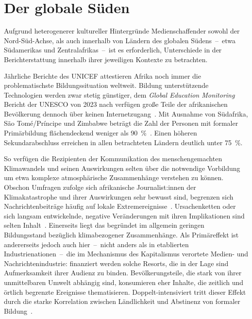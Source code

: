 \section{Der globale Süden}

Aufgrund heterogenerer kultureller Hintergründe Medienschaffender sowohl der Nord-Süd-Achse, als auch innerhalb von Ländern des globalen Südens~--~etwa Südamerikas und Zentralafrikas~--~ist es erforderlich, Unterschiede in der Berichterstattung innerhalb ihrer jeweiligen Kontexte zu betrachten.

Jährliche Berichte des UNICEF attestieren Afrika noch immer die problematischste Bildungssituation weltweit.
Bildung unterstützende Technologien werden zwar stetig günstiger,
dem \textit{Global Education Monitoring} Bericht der UNESCO von 2023 nach verfügen große Teile der afrikanischen Bevölkerung dennoch über keinen Internetzugang~\cite{Book.2023GEMReportSummaryTechnologyInEducationAToolOnWhoseTerms.2023}.
Mit Ausnahme von Südafrika, São Tomé/Príncipe und Zimbabwe beträgt die Zahl der Personen mit formaler Primärbildung flächendeckend weniger als \qty{90}{\percent}~\cite{Article..GlobalEducationMonitoringReport.}.
Einen höheren Sekundarabschluss erreichen in allen betrachteten Ländern deutlich unter \qty{75}{\percent}.\par\medskip

{%
\vspace{\baselineskip}
\centering

\label{fig:climate risk}
\vspace{\baselineskip}
}

So verfügen die Rezipienten der Kommunikation des menschengemachten Klimawandels und seinen Auswirkungen selten über die notwendige Vorbildung um etwa komplexe atmosphärische Zusammenhänge verstehen zu können.
Obschon Umfragen zufolge sich afrikanische Journalist:innen der Klimakatastrophe und ihrer Auswirkungen sehr bewusst sind, begrenzen sich Nachrichtenbeiträge häufig auf lokale Extremereignisse~\cite{TechReport.Lidubwi.ClimateJournalisminEastAfricaInAnEraOfMisinformation.2023}. %
Ursachenketten oder sich langsam entwickelnde, negative Veränderungen mit ihren Implikationen sind selten Inhalt~\cite{Booklet.Guedegbe.MEDIAPERCEPTIONSOFCLIMATECHANGEINSUBSAHARANAFRICA.2023}.%
Einerseits liegt das begründet im allgemein geringen Bildungsstand bezüglich klimabezogener Zusammenhänge.
Als Primäreffekt ist andererseits jedoch auch hier~--~nicht anders als in etablierten Industrienationen~--~die im Mechanismus des Kapitalismus verortete Medien- und Nachrichtenindustrie:
finanziert werden solche Resorts, die in der Lage sind Aufmerksamkeit ihrer Audienz zu binden.
Bevölkerungsteile, die stark von ihrer unmittelbaren Umwelt abhängig sind, konsumieren eher Inhalte, die zeitlich und örtlich begrenzte Ereignisse thematisieren.
Doppelt-intensiviert tritt dieser Effekt durch die starke Korrelation zwischen Ländlichkeit und Abstinenz von formaler Bildung~\cite{Article..GlobalEducationMonitoringReport.}.\par\medskip

